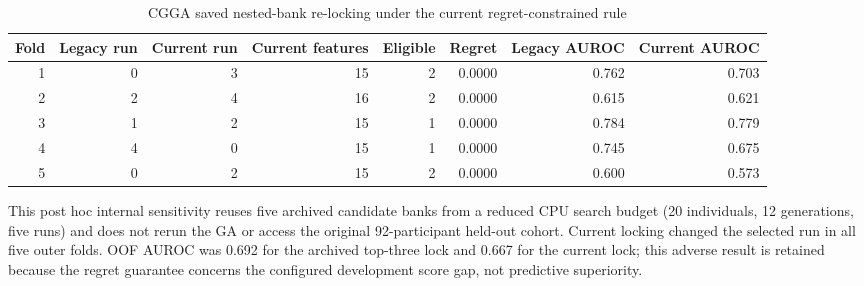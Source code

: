 \begin{table}[p]
\centering
\caption{CGGA saved nested-bank re-locking under the current regret-constrained rule}
\label{tab:supp24}
\scriptsize
\begin{tabular}{rrrrrrrr}
\toprule
Fold & Legacy run & Current run & Current features & Eligible & Regret & Legacy AUROC & Current AUROC \\
\midrule
1 & 0 & 3 & 15 & 2 & 0.0000 & 0.762 & 0.703 \\
2 & 2 & 4 & 16 & 2 & 0.0000 & 0.615 & 0.621 \\
3 & 1 & 2 & 15 & 1 & 0.0000 & 0.784 & 0.779 \\
4 & 4 & 0 & 15 & 1 & 0.0000 & 0.745 & 0.675 \\
5 & 0 & 2 & 15 & 2 & 0.0000 & 0.600 & 0.573 \\
\bottomrule
\end{tabular}
\begin{minipage}{0.98\linewidth}\scriptsize\vspace{0.3em}
This post hoc internal sensitivity reuses five archived candidate banks from a reduced CPU search budget (20 individuals, 12 generations, five runs) and does not rerun the GA or access the original 92-participant held-out cohort. Current locking changed the selected run in all five outer folds. OOF AUROC was 0.692 for the archived top-three lock and 0.667 for the current lock; this adverse result is retained because the regret guarantee concerns the configured development score gap, not predictive superiority.
\end{minipage}
\end{table}
